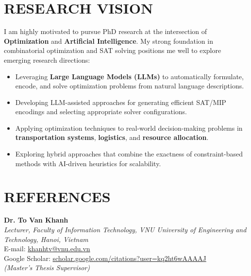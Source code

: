 \documentclass[a4paper,10pt]{extarticle}
\begin{document}
\section*{RESEARCH VISION}
\noindent
I am highly motivated to pursue PhD research at the intersection of \textbf{Optimization} and \textbf{Artificial Intelligence}. My strong foundation in combinatorial optimization and SAT solving positions me well to explore emerging research directions:
\begin{itemize}
    \item Leveraging \textbf{Large Language Models (LLMs)} to automatically formulate, encode, and solve optimization problems from natural language descriptions.
    \item Developing LLM-assisted approaches for generating efficient SAT/MIP encodings and selecting appropriate solver configurations.
    \item Applying optimization techniques to real-world decision-making problems in \textbf{transportation systems}, \textbf{logistics}, and \textbf{resource allocation}.
    \item Exploring hybrid approaches that combine the exactness of constraint-based methods with AI-driven heuristics for scalability.
\end{itemize}

\section*{REFERENCES}
\textbf{Dr. To Van Khanh}\\
\textit{Lecturer, Faculty of Information Technology, VNU University of Engineering and Technology, Hanoi, Vietnam}\\
E-mail: \href{mailto:khanhtv@vnu.edu.vn}{khanhtv@vnu.edu.vn}\\
Google Scholar: \href{https://scholar.google.com/citations?user=kq2ht6wAAAAJ}{scholar.google.com/citations?user=kq2ht6wAAAAJ}\\
\textit{(Master's Thesis Supervisor)}

\end{document}
